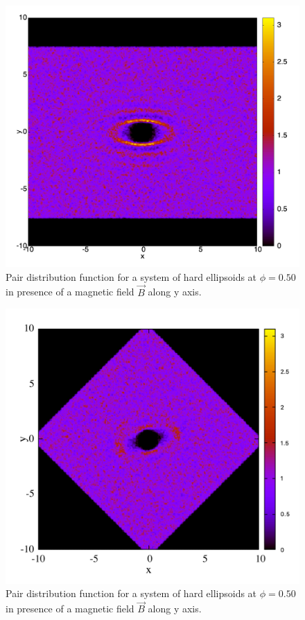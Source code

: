 \documentclass{article}
\begin{document}
\begin{figure}
    \begin{center}
    \includegraphics[width=1.0\columnwidth]{gyz_B_HE.png}
    \caption{Pair distribution function for a system of hard ellipsoids at $\phi = 0.50$ in presence of a magnetic field $\vec{B}$ along y axis.}
    \label{fig:gyz_B_HE}
    \end{center}
\end{figure}


\begin{figure}
    \centering
    \includegraphics[width=1.0\columnwidth]{gxz_B_HE.png}
    \caption{Pair distribution function for a system of hard ellipsoids at $\phi = 0.50$ in presence of a magnetic field $\vec{B}$ along y axis.}
    \label{fig:gxz_B_HE}
\end{figure}
\end{document}
